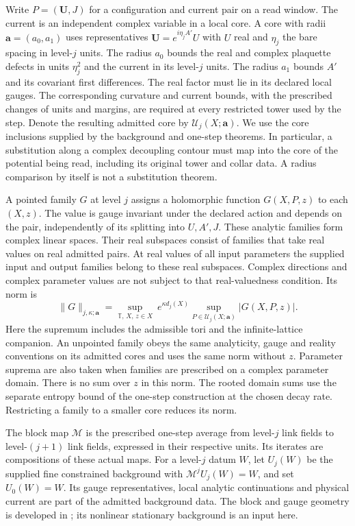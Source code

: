 \documentclass[11pt,letterpaper,reqno]{amsart}
\numberwithin{equation}{section}
\theoremstyle{definition}
\theoremstyle{remark}
\begin{document}
Write $P=(\mathbf U,J)$ for a configuration and current pair on a read
window. The current is an independent complex variable in a local core.
A core with radii $\mathbf a=(a_0,a_1)$ uses representatives
$\mathbf U=e^{i\eta_j A'}U$ with $U$ real and $\eta_j$ the bare spacing
in level-$j$ units. The radius $a_0$ bounds the real and complex plaquette
defects in units $\eta_j^2$ and the current in its level-$j$ units.
The radius $a_1$ bounds $A'$ and its covariant first differences.
The real factor must lie in its declared local gauges. The corresponding
curvature and current bounds, with the prescribed changes of units and
margins, are required at every restricted tower used by the step.
Denote the resulting admitted core by
$\mathcal U_j(X;\mathbf a)$. We use the core inclusions supplied by the
background and one-step theorems. In particular, a substitution along a
complex decoupling contour must map into the core of the potential being
read, including its original tower and collar data. A radius comparison
by itself is not a substitution theorem.

A pointed family $G$ at level $j$ assigns a holomorphic function
$G(X,P,z)$ to each $(X,z)$. The value is gauge invariant under the
declared action and depends on the pair, independently of its splitting
into $U,A',J$. These analytic families form complex linear spaces.
Their real subspaces consist of families that take real values on
real admitted pairs. At real values of all input parameters the
supplied input and output families belong to these real subspaces.
Complex directions and complex parameter values are not subject
to that real-valuedness condition.
Its norm is
\begin{equation}\label{em:eq-pointed-norm}
 \|G\|_{j,\kappa;\mathbf a}
   =\sup_{\mathbb T,\,X,\,z\in X}\ 
           e^{\kappa d_j(X)}\sup_{P\in\mathcal U_j(X;\mathbf a)}
                 |G(X,P,z)| .
\end{equation}
Here the supremum includes the admissible tori and the infinite-lattice
companion. An unpointed family obeys the same analyticity, gauge and
reality conventions on its admitted cores and uses the same norm
without $z$. Parameter
suprema are also taken when families are prescribed on a complex
parameter domain. There is no sum over $z$ in this norm. The rooted
domain sums use the separate entropy bound of the one-step construction
at the chosen decay rate. Restricting a family to a smaller core reduces
its norm.

The block map $\mathcal M$ is the prescribed one-step average from
level-$j$ link fields to level-$(j+1)$ link fields, expressed in their
respective units. Its iterates are compositions of these actual maps.
For a level-$j$ datum $W$, let $U_j(W)$ be the supplied fine
constrained background with $\mathcal M^j U_j(W)=W$, and set
$U_0(W)=W$. Its gauge representatives, local analytic continuations
and physical current are part of the admitted background data.
The block and gauge geometry is developed in \cite{BA}; its
nonlinear stationary background is an input here.
\end{document}
